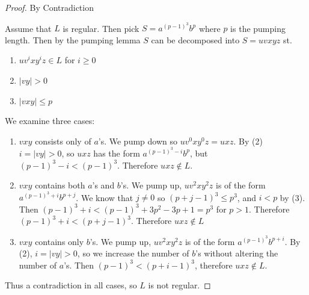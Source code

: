 \documentclass[11pt]{article}
\begin{document}
\begin{proof} By Contradiction

Assume that $L$ is regular. Then pick $S = a^{(p-1)^3} b^p$ where $p$ is the pumping length. Then by the pumping lemma $S$ can be decomposed into $S = uvxyz$ st.

\begin{enumerate}[(1)]

 \item $uv^ixy^iz \in L$ for $i \geq 0$
 \item $|vy| > 0$
 \item $|vxy| \leq p$
\end{enumerate}

We examine three cases:

\begin{enumerate}
  \item $vxy$ consists only of $a$'s. We pump down so $uv^0 x y^0 z = uxz$. By (2) $i = |vy| > 0$, so $uxz$ has the form $a^{(p-1)^3 - i} b^p$, but $(p-1)^3 - i < (p-1)^3$. Therefore $uxz \notin L$.
  \item $vxy$ contains both $a$'s and $b$'s. We pump up, $uv^2xy^2z$ is of the form $a^{(p-1)^3 + i} b^{p + j}$. We know that $j \neq 0$ so $(p + j - 1)^3 \leq p^3$, and $i < p$ by (3). Then $(p-1)^3 + i < (p-1)^3 + 3p^2 - 3p + 1 = p^3$ for $p > 1$. Therefore $(p-1)^3 + i < (p + j - 1)^3$. Therefore $uxz \notin L$
  \item $vxy$ contains only $b$'s. We pump up, $uv^2xy^2z$ is of the form $a^{(p-1)^3}b^{p + i}$. By (2), $i = |vy| > 0$, so we increase the number of $b$'s without altering the number of $a$'s. Then $(p-1)^3 < (p + i - 1)^3$, therefore $uxz \notin L$.
\end{enumerate}

Thus a contradiction in all cases, so $L$ is not regular.

\end{proof}
\end{document}
